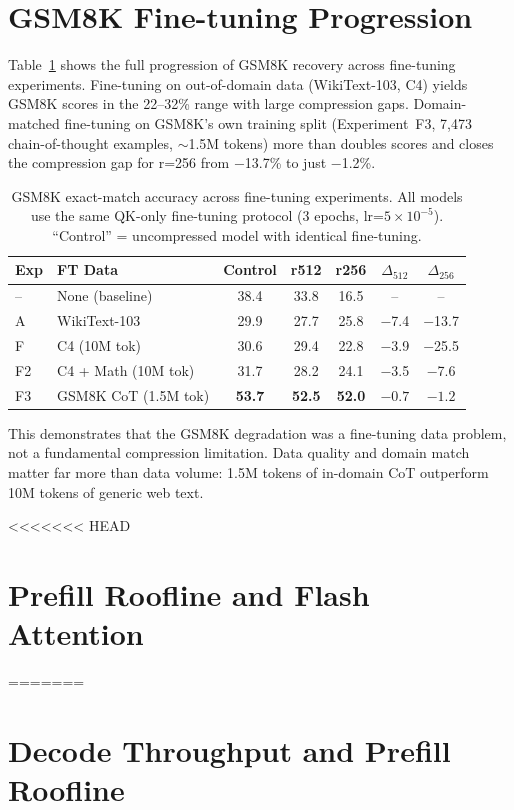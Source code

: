\documentclass{article} %
\begin{document}
\section{GSM8K Fine-tuning Progression}\label{app:gsm8k}

Table~\ref{tab:gsm8k_progression} shows the full progression of GSM8K recovery across fine-tuning experiments. Fine-tuning on out-of-domain data (WikiText-103, C4) yields GSM8K scores in the 22--32\% range with large compression gaps. Domain-matched fine-tuning on GSM8K's own training split (Experiment~F3, 7{,}473 chain-of-thought examples, $\sim$1.5M tokens) more than doubles scores and closes the compression gap for r=256 from $-$13.7\% to just $-$1.2\%.

\begin{table}[h]
\centering
\caption{GSM8K exact-match accuracy across fine-tuning experiments. All models use the same QK-only fine-tuning protocol (3 epochs, lr=$5 \times 10^{-5}$). ``Control'' = uncompressed model with identical fine-tuning.}
\label{tab:gsm8k_progression}
\begin{tabular}{llccccc}
\toprule
Exp & FT Data & Control & r512 & r256 & $\Delta_{512}$ & $\Delta_{256}$ \\
\midrule
-- & None (baseline) & 38.4 & 33.8 & 16.5 & -- & -- \\
A & WikiText-103 & 29.9 & 27.7 & 25.8 & $-$7.4 & $-$13.7 \\
F & C4 (10M tok) & 30.6 & 29.4 & 22.8 & $-$3.9 & $-$25.5 \\
F2 & C4 + Math (10M tok) & 31.7 & 28.2 & 24.1 & $-$3.5 & $-$7.6 \\
\midrule
F3 & GSM8K CoT (1.5M tok) & \textbf{53.7} & \textbf{52.5} & \textbf{52.0} & $\mathbf{-0.7}$ & $\mathbf{-1.2}$ \\
\bottomrule
\end{tabular}
\end{table}

This demonstrates that the GSM8K degradation was a fine-tuning data problem, not a fundamental compression limitation. Data quality and domain match matter far more than data volume: 1.5M tokens of in-domain CoT outperform 10M tokens of generic web text.


<<<<<<< HEAD
\section{Prefill Roofline and Flash Attention}\label{app:throughput}
=======
\section{Decode Throughput and Prefill Roofline}\label{app:throughput}
\end{document}
